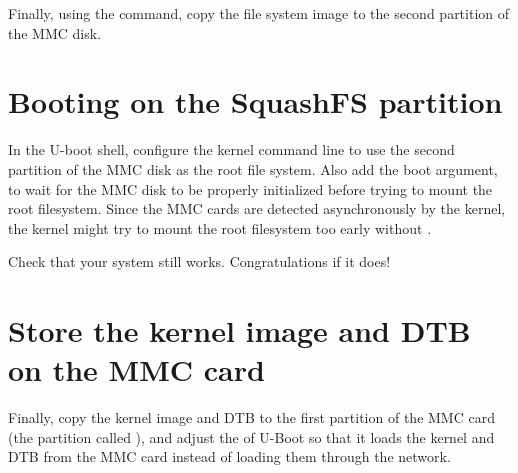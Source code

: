 Finally, using the  command, copy the file system image to
the second partition of the MMC disk.

\section{Booting on the SquashFS partition}

In the U-boot shell, configure the kernel command line to use the
second partition of the MMC disk as the root file system. Also add the
 boot argument, to wait for the MMC disk to be properly
initialized before trying to mount the root filesystem. Since the MMC
cards are detected asynchronously by the kernel, the kernel might try
to mount the root filesystem too early without .

Check that your system still works. Congratulations if it does!

\section{Store the kernel image and DTB on the MMC card}

Finally, copy the  kernel image and DTB to the first partition of
the MMC card (the partition called ), and adjust the
 of U-Boot so that it loads the kernel and DTB from the MMC card
instead of loading them through the network.

